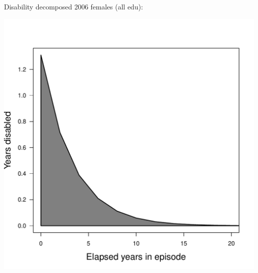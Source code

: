 \documentclass[20pt,usenames,dvipsnames]{beamer}
\begin{document}
\begin{frame}[plain]
\Large
Disability decomposed 2006 females (all edu):\vspace{-1em}
\begin{center}
\includegraphics[scale=1]{Figures/DisElapsed.pdf}
\end{center}
\end{frame}
\end{document}
